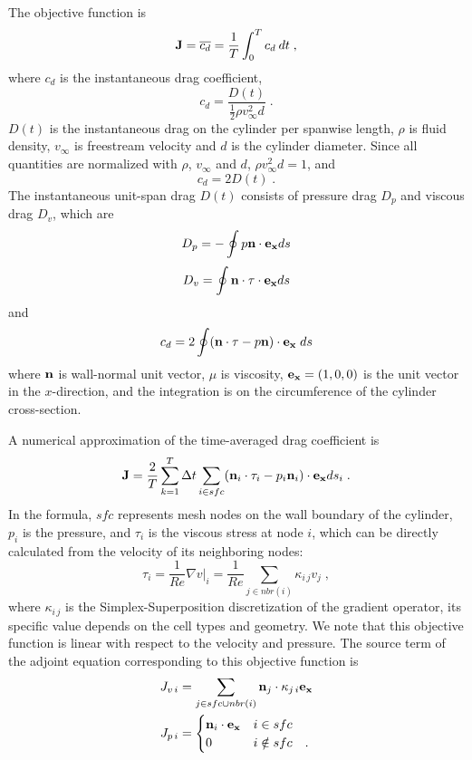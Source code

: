 The objective function is
\[ {\bf J} = \overline{c_d} = \frac{1}{T} \int_0^T c_d\: dt \;,\]
where $c_d$ is the instantaneous drag coefficient,
\[ c_d = \frac{D(t)}{\frac12 \rho v_\infty^2 d} \;.\]
$D(t)$ is the instantaneous drag on the cylinder per spanwise length,
$\rho$ is fluid density, $v_\infty$ is freestream velocity and $d$ is the
cylinder diameter.  Since all quantities are normalized with $\rho$,
$v_\infty$ and $d$, $\rho v_\infty^2 d = 1$, and
\[ c_d = 2 D(t) \;.\]
The instantaneous unit-span drag $D(t)$ consists of pressure drag $D_p$ and
viscous drag $D_v$, which are
\[ D_p = -\oint p {\bf n} \cdot {\bf e_x} ds \]
\[ D_v = \oint {\bf n} \cdot \tau \cdot {\bf e_x} ds \]
and
\[ c_d = 2 \oint ({\bf n} \cdot \tau - p {\bf n}) \cdot {\bf e_x} \; ds \]
where $\bf n$ is wall-normal unit vector,
$\mu$ is viscosity, ${\bf e_x} = (1,0,0)$ is the
unit vector in the $x$-direction, and the integration is on the circumference
of the cylinder cross-section.

A numerical approximation of the time-averaged drag coefficient is
\begin{equation} \label{discrete_meancd}
  {\bf J} = \frac{2}{T} \sum_{k=1}^T \Delta t
         \sum_{i \in sfc}
         ({\bf n}_i \cdot \tau_i - p_i {\bf n}_i) \cdot {\bf e_x} ds_i\; .
\end{equation}
In the formula, $sfc$ represents mesh nodes on the wall boundary of
the cylinder, $p_i$ is the pressure, and $\tau_i$ is the
viscous stress at node $i$, which can be directly calculated from the velocity
of its neighboring nodes:
\[ \tau_i = \frac{1}{Re} \nabla v |_i
 = \frac{1}{Re} \sum_{j\in nbr(i)} \kappa_{i\,j} v_{j} \;, \]
where $\kappa_{i\,j}$ is the Simplex-Superposition discretization of
the gradient operator, its specific value depends on the cell types and
geometry.  We note that this objective function is linear with
respect to the velocity and pressure.  The source term of the
adjoint equation corresponding to this objective function is
\begin{equation} \begin{split} \label{drag_adjsrc}
 J_{v\,i} &= \sum_{j \in sfc \cup nbr(i)} {\bf n}_j \cdot \kappa_{j\,i}
             {\bf e_x} \\
 J_{p\,i} &= \begin{cases} {\bf n}_i \cdot {\bf e_x} & i \in sfc \\
                           0 & i \notin sfc \quad.\end{cases}
\end{split} \end{equation}


